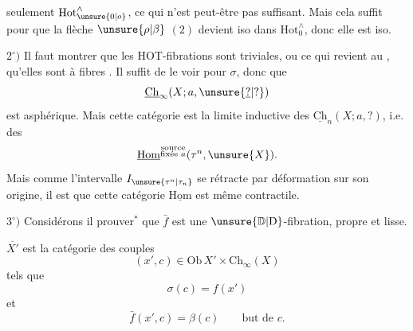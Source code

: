 seulement  $\mathrm{Hot}_{\unsure{0|o}}^{\wedge}$, ce qui n'est peut-être pas suffisant. Mais cela suffit pour  que la flèche $\unsure{\rho|\beta}$  $(2)$ devient iso dans $\mathrm{Hot}_0^{\wedge}$, donc elle est iso.

$2^\circ)$ Il faut montrer que les HOT-fibrations
sont triviales, ou ce qui revient au ,  qu'elles sont à fibres . Il suffit de le voir pour $\sigma$, donc que
\[
\underline{\mathrm{Ch}}_{\infty}(X;a,\unsure{\underline{?}|?})
\]
est asphérique. Mais cette catégorie est la limite inductive des $\underline{\mathrm{Ch}}_n(X;a,?)$, i.e. des
\[
\underline{\mathrm{Hom}}^{\substack{\text{source}\\\text{fixée }a}}(\tau^n,\unsure{X}).
\]
Mais comme l'intervalle $I_{\unsure{\tau^n|\tau_n}}$ se rétracte par déformation sur son origine, il est  que cette catégorie $\underline{\mathrm{Hom}}$ est même contractile.

$3^\circ)$ Considérons
il
 prouver$^{*}$ que $\bar f$ est une $\unsure{\mathbb D|\mathrm D}$-fibration, propre et lisse. 

$\overline{X'}$ est la catégorie des couples
\[
(x',c)\in\mathrm{Ob}\,X'\times\mathrm{Ch}_{\infty}(X)
\]
tels que
\[
\sigma(c)=f(x')
\]
et
\[
\bar f(x',c)=\beta(c)\qquad\text{but de }c.
\]

